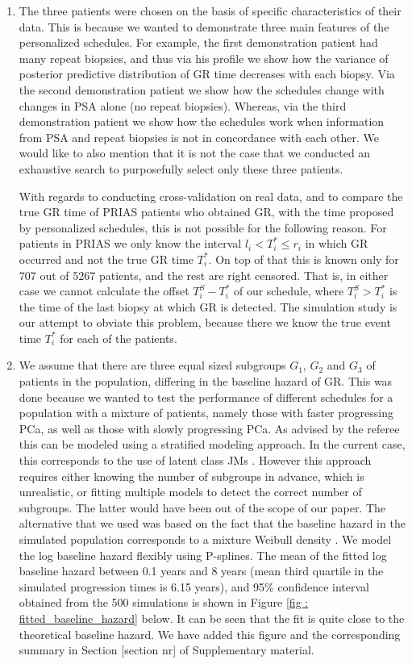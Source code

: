 \begin{enumerate}
	\item The three patients were chosen on the basis of specific characteristics of their data. This is because we wanted to demonstrate three main features of the personalized schedules. For example, the first demonstration patient had many repeat biopsies, and thus via his profile we show how the variance of posterior predictive distribution of GR time decreases with each biopsy. Via the second demonstration patient we show how the schedules change with changes in PSA alone (no repeat biopsies). Whereas, via the third demonstration patient we show how the schedules work when information from PSA and repeat biopsies is not in concordance with each other. We would like to also mention that it is not the case that we conducted an exhaustive search to purposefully select only these three patients. 

	With regards to conducting cross-validation on real data, and to compare the true GR time of PRIAS patients who obtained GR, with the time proposed by personalized schedules, this is not possible for the following reason. For patients in PRIAS we only know the interval $l_i < T^*_i \leq r_i$ in which GR occurred and not the true GR time $T^*_i$. On top of that this is known only for 707 out of 5267 patients, and the rest are right censored. That is, in either case we cannot calculate the offset $T^S_i - T^*_i$ of our schedule, where $T^S_i > T^*_i$ is the time of the last biopsy at which GR is detected. The simulation study is our attempt to obviate this problem, because there we know the true event time $T^*_i$ for each of the patients. 

	\item We assume that there are three equal sized subgroups $G_1$, $G_2$ and $G_3$ of patients in the population, differing in the baseline hazard of GR. This was done because we wanted to test the performance of different schedules for a population with a mixture of patients, namely those with faster progressing PCa, as well as those with slowly progressing PCa. As advised by the referee this can be modeled using a stratified modeling approach. In the current case, this corresponds to the use of latent class JMs \citep{proust2014joint}. However this approach requires either knowing the number of subgroups in advance, which is unrealistic, or fitting multiple models to detect the correct number of subgroups. The latter would have been out of the scope of our paper. The alternative that we used was based on the fact that the baseline hazard in the simulated population corresponds to a mixture Weibull density \citep{razali2013mixture}. We model the log baseline hazard flexibly using P-splines. The mean of the fitted log baseline hazard between 0.1 years and 8 years (mean third quartile in the simulated progression times is 6.15 years), and 95\% confidence interval obtained from the 500 simulations is shown in Figure \ref{fig : fitted_baseline_hazard} below. It can be seen that the fit is quite close to the theoretical baseline hazard. We have added this figure and the corresponding summary in Section [section nr] of Supplementary material.


\end{enumerate}
